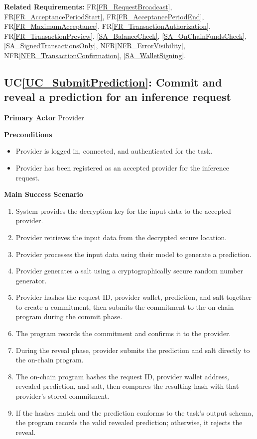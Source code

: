 \documentclass[12pt]{article}
\newcounter{ucnum} %
\newcommand{\ucref}[1]{UC\ref{#1}}
\newcommand{\rref}[1]{FR\ref{#1}}
\newcommand{\nfrref}[1]{NFR\ref{#1}}
\begin{document}
\textbf{Related Requirements:} \rref{FR_RequestBroadcast}, \rref{FR_AcceptancePeriodStart}, \rref{FR_AcceptancePeriodEnd}, \rref{FR_MaximumAcceptance}, \rref{FR_TransactionAuthorization}, \rref{FR_TransactionPreview}, \ref{SA_BalanceCheck}, \ref{SA_OnChainFundsCheck}, \ref{SA_SignedTransactionsOnly}, \nfrref{NFR_ErrorVisibility}, \nfrref{NFR_TransactionConfirmation}, \ref{SA_WalletSigning}.

 \label{UC_SubmitPrediction}
\subsection{\ucref{UC_SubmitPrediction}: Commit and reveal a prediction for an inference request}

\textbf{Primary Actor}
Provider

\textbf{Preconditions}
\begin{itemize}
\item Provider is logged in, connected, and authenticated for the task.
\item Provider has been registered as an accepted provider for the inference request.
\end{itemize}

\textbf{Main Success Scenario}
\begin{enumerate}
\item System provides the decryption key for the input data to the accepted provider.
\item Provider retrieves the input data from the decrypted secure location.
\item Provider processes the input data using their model to generate a prediction.
\item Provider generates a salt using a cryptographically secure random number generator.
\item Provider hashes the request ID, provider wallet, prediction, and salt together to create a commitment, then submits the commitment to the on-chain program during the commit phase.
\item The program records the commitment and confirms it to the provider.
\item During the reveal phase, provider submits the prediction and salt directly to the on-chain program.
\item The on-chain program hashes the request ID, provider wallet address, revealed prediction, and salt, then compares the resulting hash with that provider's stored commitment.
\item If the hashes match and the prediction conforms to the task's output schema, the program records the valid revealed prediction; otherwise, it rejects the reveal.
\end{enumerate}
\end{document}
